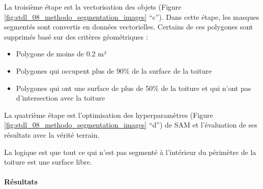 {{{{\par{La troisième étape est la vectorisation des objets (Figure \ref{fig:stdl_08_methodo_segmentation_images} ``c''). Dans cette étape, les masques segmentés sont convertis en données vectorielles. Certains de ces polygones sont supprimés basé sur des critères géométriques :}
\begin{itemize}
    \item Polygone de moins de 0.2 m²
    \item Polygones qui occupent plus de 90\% de la surface de la toiture
    \item Polygones qui ont une surface de plus de 50\% de la toiture et qui n'ont pas d'intersection avec la toiture
\end{itemize}

\par{La quatrième étape est l'optimisation des hyperparamètres (Figure \ref{fig:stdl_08_methodo_segmentation_images} ``d'') de SAM et l'évaluation de ses résultats avec la vérité terrain.}

\par{La logique est que tout ce qui n'est pas segmenté à l'intérieur du périmètre de la toiture est une surface libre.}

\newpage
\paragraph{Résultats}

}}}}
